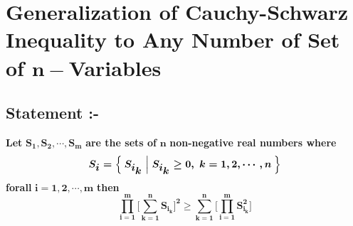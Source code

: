 \documentclass[12pt]{article}
\begin{document}
\pagebreak 


\section{Generalization of Cauchy-Schwarz Inequality to Any Number of Set of $\boldsymbol{n-}$Variables}

\vspace*{2.5cm}

\subsection{Statement :-}


\Large{\textbf{Let }$\boldsymbol{S_1,S_2,\cdots,S_m}$\textbf{ are the sets of }$\boldsymbol{n}$\textbf{ non-negative real numbers where }\[\boldsymbol{S_{\displaystyle{i}}=\Set{ S_{\displaystyle{i_{\displaystyle{k}}}} | S_{\displaystyle{i_{\displaystyle{k}}}}\geq 0,\ k=1,2,\cdots,n} }\]\textbf{forall }$\boldsymbol{i=1,2,\cdots,m}$\textbf{ then}}\LARGE{\[\boldsymbol{\prod_{i=1}^m \Bigg[\sum_{k=1}^n S_{\displaystyle{i_{\displaystyle{k}}}} \Bigg]^2\geq \sum_{k=1}^n \Bigg[\prod_{i=1}^m S_{\displaystyle{i_{\displaystyle{k}}}}^2\Bigg]}\]}
\end{document}
